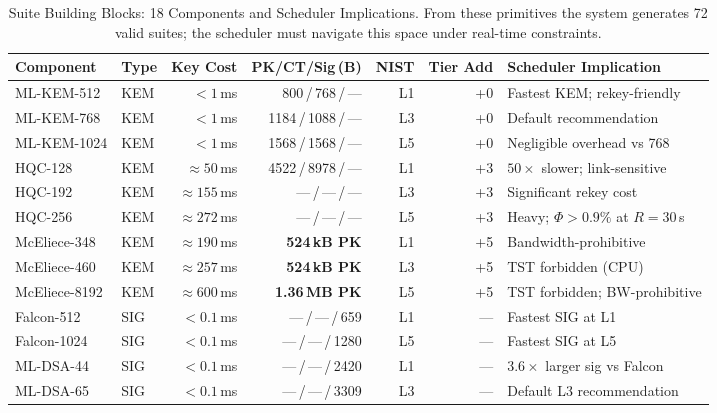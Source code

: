 \begin{table}[!t]
\centering
\caption{Suite Building Blocks: 18 Components and Scheduler Implications.
From these primitives the system generates 72 valid suites; the
scheduler must navigate this space under real-time constraints.}
\label{tab:sched_taxonomy}
\footnotesize
\setlength{\tabcolsep}{3pt}
\begin{tabular}{@{}llrrrrl@{}}
\toprule
\textbf{Component} & \textbf{Type}
& \textbf{Key Cost}
& \textbf{PK/CT/Sig\,(B)}
& \textbf{NIST}
& \textbf{Tier Add}
& \textbf{Scheduler Implication} \\
\midrule
ML-KEM-512   & KEM & $<1$\,ms   & 800\,/\,768\,/\,--- & L1 & +0
  & Fastest KEM; rekey-friendly \\
ML-KEM-768   & KEM & $<1$\,ms   & 1184\,/\,1088\,/\,--- & L3 & +0
  & Default recommendation \\
ML-KEM-1024  & KEM & $<1$\,ms   & 1568\,/\,1568\,/\,--- & L5 & +0
  & Negligible overhead vs 768 \\
HQC-128      & KEM & ${\approx}50$\,ms   & 4522\,/\,8978\,/\,--- & L1 & +3
  & $50{\times}$ slower; link-sensitive \\
HQC-192      & KEM & ${\approx}155$\,ms  & ---\,/\,---\,/\,---   & L3 & +3
  & Significant rekey cost \\
HQC-256      & KEM & ${\approx}272$\,ms  & ---\,/\,---\,/\,---   & L5 & +3
  & Heavy; $\Phi>0.9\%$ at $R{=}30$\,s \\
McEliece-348 & KEM & ${\approx}190$\,ms  & \textbf{524\,kB PK} & L1 & +5
  & Bandwidth-prohibitive \\
McEliece-460 & KEM & ${\approx}257$\,ms  & \textbf{524\,kB PK} & L3 & +5
  & TST forbidden (CPU) \\
McEliece-8192& KEM & ${\approx}600$\,ms  & \textbf{1.36\,MB PK}& L5 & +5
  & TST forbidden; BW-prohibitive \\
\midrule
Falcon-512    & SIG & $<0.1$\,ms & ---\,/\,---\,/\,659  & L1 & ---
  & Fastest SIG at L1 \\
Falcon-1024   & SIG & $<0.1$\,ms & ---\,/\,---\,/\,1280 & L5 & ---
  & Fastest SIG at L5 \\
ML-DSA-44     & SIG & $<0.1$\,ms & ---\,/\,---\,/\,2420 & L1 & ---
  & $3.6{\times}$ larger sig vs Falcon \\
ML-DSA-65     & SIG & $<0.1$\,ms & ---\,/\,---\,/\,3309 & L3 & ---
  & Default L3 recommendation \\

\end{tabular}
\end{table}
